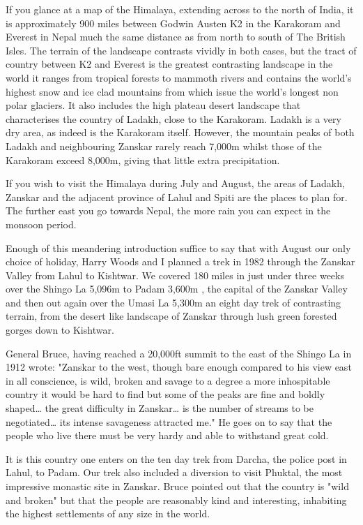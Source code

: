 \documentclass[a5paper,openany,font 10pt]{scrbook}
\begin{document}
If you glance at a map of the Himalaya, extending across to
the north of India, it is approximately 900 miles between Godwin
Austen  K2  in the Karakoram and Everest in Nepal   much the same
distance as from north to south of The British Isles. The terrain
of the landscape contrasts vividly in both cases, but the tract
of country between K2 and Everest is the greatest contrasting
landscape in the world  it ranges from tropical forests to
mammoth rivers and contains the  world's highest snow  and
ice clad mountains from which issue the world's longest non polar
glaciers. It also includes the high plateau desert landscape that
characterises the country of Ladakh, close to the Karakoram.
Ladakh is a very dry area, as indeed is the Karakoram itself.
However, the mountain peaks of both Ladakh and neighbouring
Zanskar rarely reach 7,000m whilst those of the Karakoram exceed
8,000m, giving that little extra precipitation.

If you wish to visit the Himalaya during July and August,
the areas of Ladakh, Zanskar and the adjacent province of Lahul
and Spiti are the places to plan for. The further east you go
towards Nepal, the more rain you can expect in the monsoon
period.

Enough of this meandering introduction  suffice to say that
with August our only choice of holiday, Harry Woods and I planned
a trek in 1982 through the Zanskar Valley from Lahul to Kishtwar.
We covered 180 miles in just under three weeks over the Shingo La
 5,096m  to Padam  3,600m , the capital of the Zanskar Valley and
then out again over the Umasi La  5,300m   an eight day trek of
contrasting terrain, from the desert like landscape of Zanskar
through lush green forested gorges down to Kishtwar.

General Bruce, having reached a 20,000ft summit to the east
of the Shingo La in 1912 wrote:
 "Zanskar to the west, though bare enough  compared to his
view east  in all conscience, is wild, broken and savage to a
degree  a more inhospitable country it would be hard to find  but
some of the peaks are fine and boldly shaped\ldots{} the great
difficulty in Zanskar\ldots{} is the number of streams to be
negotiated\ldots{} its intense savageness attracted me."
He goes on to say that the people who live there must be
very hardy and able to withstand great cold.

It is this country one enters on the ten day trek from
Darcha, the police post in Lahul, to Padam. Our trek also
included a diversion to visit Phuktal, the most impressive
monastic site in Zanskar. Bruce pointed out that the country is
"wild and broken"   but that the people are reasonably kind and
interesting, inhabiting the highest settlements of any size in
the world.
\end{document}
